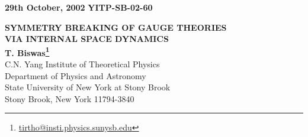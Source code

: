 \documentclass[a4paper,12pt]{article}
\def\mhref#1{\href{mailto:#1}{#1}}
\begin{document}
\newcommand{\p}{\partial}
\newcommand{\hp}{\hat{\p}}
\newcommand{\ov}{\overline}
\newcommand{\da}{^{\dagger}}
\newcommand{\w}{\wedge}
\newcommand{\al}{\alpha}
\newcommand{\bb}{\beta}
\newcommand{\ga}{\gamma}
\newcommand{\te}{\theta}
\newcommand{\de}{\delta}
\newcommand{\et}{\tilde{e}}
\newcommand{\ze}{\zeta}
\newcommand{\s}{\sigma}
\newcommand{\e}{\epsilon}
\newcommand{\om}{\omega}
\newcommand{\Om}{\Omega}
\newcommand{\la}{\lambda}
\newcommand{\La}{\Lambda}
\newcommand{\n}{\nabla}
\newcommand{\hn}{\hat{\nabla}}
\newcommand{\hph}{\hat{\phi}}
\newcommand{\ah}{\hat{a}}
\newcommand{\bh}{\hat{b}}
\newcommand{\ch}{\hat{c}}
\newcommand{\eh}{\hat{e}}
\newcommand{\ph}{\hat{p}}
\newcommand{\qh}{\hat{q}}
\newcommand{\mh}{\hat{m}}
\newcommand{\nh}{\hat{n}}
\newcommand{\as}{\breve{a}}
\newcommand{\bs}{\breve{b}}
\newcommand{\cs}{\breve{c}}
\newcommand{\ds}{\breve{d}}
\newcommand{\es}{\breve{e}}
\newcommand{\ms}{\breve{m}}
\newcommand{\ns}{\breve{n}}
\newcommand{\ps}{\breve{p}}
\newcommand{\ad}{\dot{a}}
\newcommand{\bd}{\dot{b}}
\newcommand{\gd}{\dot{c}}
\newcommand{\dd}{\dot{\delta}}
\newcommand{\ed}{\dot{\eta}}
\newcommand{\zd}{\dot{\zeta}}
\newcommand{\md}{\dot{m}}
\newcommand{\nd}{\dot{n}}
\newcommand{\az}{\grave{a}}
\newcommand{\bz}{\grave{b}}
\newcommand{\nz}{\grave{n}}
\newcommand{\mz}{\grave{m}}
\newcommand{\tb}{\overline{\theta}}
\newcommand{\ti}{\widetilde}

\newcommand{\2}{\textstyle{1\over 2}}
\newcommand{\3}{\frac{1}{3}}
\newcommand{\4}{\frac{1}{4}}
\newcommand{\8}{\frac{1}{8}}
\newcommand{\6}{\frac{1}{16}}
\newcommand{\ra}{\rightarrow}
\newcommand{\Ra}{\Rightarrow}
\newcommand{\im}{\Longleftrightarrow}
\newcommand{\hs}{\hspace{5mm}}
\newcommand{\x}{\star}
\newcommand{\Delt}{\p^{\star}}

\thispagestyle{empty}
{\bf 29th October, 2002} \hspace{\fill}
{\bf YITP-SB-02-60}

\vspace{1cm}
\begin{center}{\Large{\bf SYMMETRY BREAKING OF GAUGE THEORIES\\

\vspace{3mm}
 VIA INTERNAL SPACE DYNAMICS}}\\
\vspace{1cm}
{\large{\bf T. Biswas\footnote{\mhref{tirtho@insti.physics.sunysb.edu} }}}\\
\vspace{5mm}
{\small C.N. Yang Institute of Theoretical Physics\\
Department of Physics and Astronomy\\
State University of New York at Stony Brook\\
Stony Brook, New York 11794-3840}
\end{center}
\end{document}
